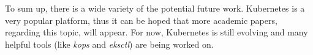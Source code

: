 To sum up, there is a wide variety of the potential future work. Kubernetes is a very popular platform, thus it can be hoped that more academic papers, regarding this topic, will appear. For now, Kubernetes is still evolving and many helpful tools (like \textit{kops} and \textit{eksctl}) are being worked on.

